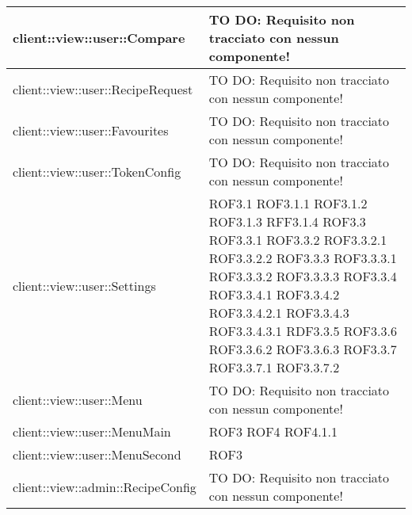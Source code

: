 \begin{center}
\begin{longtable}{| p{11cm} | p{2.5cm} |}
\hline
client::view::user::Compare & TO DO: Requisito non tracciato con nessun componente! \\
\hline
client::view::user::RecipeRequest & TO DO: Requisito non tracciato con nessun componente! \\
\hline
client::view::user::Favourites & TO DO: Requisito non tracciato con nessun componente! \\
\hline
client::view::user::TokenConfig & TO DO: Requisito non tracciato con nessun componente! \\
\hline
client::view::user::Settings & ROF3.1 \newline ROF3.1.1 \newline ROF3.1.2 \newline ROF3.1.3 \newline RFF3.1.4 \newline ROF3.3 \newline ROF3.3.1 \newline ROF3.3.2 \newline ROF3.3.2.1 \newline ROF3.3.2.2 \newline ROF3.3.3 \newline ROF3.3.3.1 \newline ROF3.3.3.2 \newline ROF3.3.3.3 \newline ROF3.3.4 \newline ROF3.3.4.1 \newline ROF3.3.4.2 \newline ROF3.3.4.2.1 \newline ROF3.3.4.3 \newline ROF3.3.4.3.1 \newline RDF3.3.5 \newline ROF3.3.6 \newline ROF3.3.6.2 \newline ROF3.3.6.3 \newline ROF3.3.7 \newline ROF3.3.7.1 \newline ROF3.3.7.2 \\
\hline
client::view::user::Menu & TO DO: Requisito non tracciato con nessun componente! \\
\hline
client::view::user::MenuMain & ROF3 \newline ROF4 \newline ROF4.1.1 \\
\hline
client::view::user::MenuSecond & ROF3 \\
\hline
client::view::admin::RecipeConfig & TO DO: Requisito non tracciato con nessun componente! \\

\end{longtable}
\end{center}
